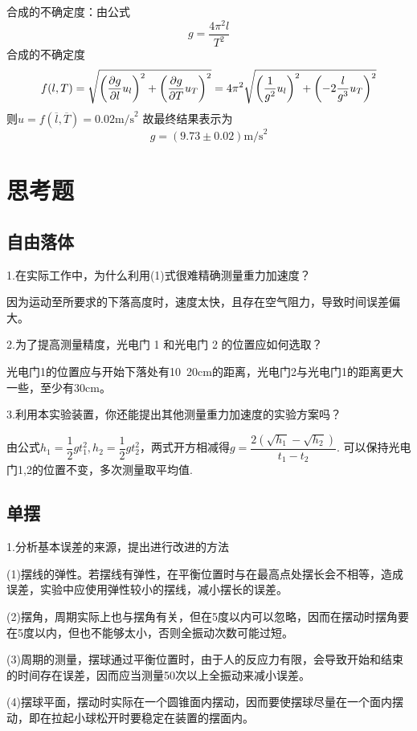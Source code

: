 \documentclass[11pt]{article}
\begin{document}
合成的不确定度：由公式
$$ g=\dfrac{4\pi^2l}{T^2} $$
合成的不确定度
	$$f(l,T)=\sqrt{\left ( \dfrac{\partial g}{\partial l}u_l \right )^2 +\left ( \dfrac{\partial g}{\partial T}u_T \right )^2 } \\
	=4\pi^2\sqrt{\left ( \dfrac{1}{g^2} u_l \right )^2 +\left ( -2\dfrac{l}{g^3} u_T \right )^2 }  $$
则$ u=f(\overline{l},\overline{T})=0.02 \text{m/s}^2$
故最终结果表示为
$$ g=(9.73\pm 0.02)\text{m/s}^2 $$

\section{思考题}
\subsection{自由落体}
1.在实际工作中，为什么利用(1)式很难精确测量重力加速度？

因为运动至所要求的下落高度时，速度太快，且存在空气阻力，导致时间误差偏大。

2.为了提高测量精度，光电门 1 和光电门 2 的位置应如何选取？

光电门1的位置应与开始下落处有10~20cm的距离，光电门2与光电门1的距离更大一些，至少有30cm。

3.利用本实验装置，你还能提出其他测量重力加速度的实验方案吗？

由公式$ h_1=\dfrac{1}{2}gt_1^2,h_2=\dfrac{1}{2}gt_2^2 $，两式开方相减得$ g=\dfrac{2(\sqrt{h_1}-\sqrt{h_2})}{t_1-t_2} $. 可以保持光电门1,2的位置不变，多次测量取平均值.
\subsection{单摆} 
1.分析基本误差的来源，提出进行改进的方法

(1)摆线的弹性。若摆线有弹性，在平衡位置时与在最高点处摆长会不相等，造成误差，实验中应使用弹性较小的摆线，减小摆长的误差。

(2)摆角，周期实际上也与摆角有关，但在5度以内可以忽略，因而在摆动时摆角要在5度以内，但也不能够太小，否则全振动次数可能过短。

(3)周期的测量，摆球通过平衡位置时，由于人的反应力有限，会导致开始和结束的时间存在误差，因而应当测量50次以上全振动来减小误差。

(4)摆球平面，摆动时实际在一个圆锥面内摆动，因而要使摆球尽量在一个面内摆动，即在拉起小球松开时要稳定在装置的摆面内。
\end{document}
